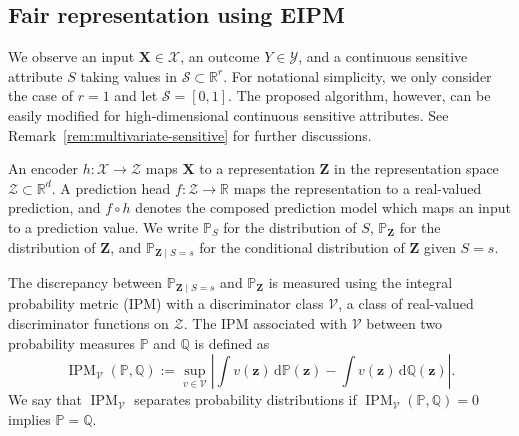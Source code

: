\documentclass{article} %
\begin{document}
\subsection{Fair representation using EIPM}
\label{sec:frem}

We observe an input $\mathbf{X}\in\mathcal{X}$, an outcome $Y\in\mathcal{Y}$, and a continuous sensitive attribute $S$ taking values in  $\mathcal{S}\subset \mathbb{R}^r.$ For notational simplicity,  we only consider the case of $r=1$ and let $\mathcal{S}=[0,1].$
The proposed algorithm, however, can be easily modified for high-dimensional continuous sensitive attributes. See Remark~\ref{rem:multivariate-sensitive} for further discussions.

An encoder $h:\mathcal{X}\to\mathcal{Z}$ maps $\mathbf{X}$ to a representation $\mathbf{Z}$ in the representation space $\mathcal{Z}\subset \mathbb{R}^d.$ A prediction head $f:\mathcal{Z}\to\mathbb{R}$ maps the representation to a real-valued prediction, and $f\circ h$ denotes the composed prediction model
which maps an input to a prediction value. 
We write $\mathbb{P}_S$ for the distribution of $S$, $\mathbb{P}_{\mathbf{Z}}$ for the distribution of $\mathbf{Z}$, and $\mathbb{P}_{\mathbf{Z}\mid S=s}$ for the conditional distribution of $\mathbf{Z}$ given $S=s$.  

The discrepancy between $\mathbb{P}_{\mathbf{Z}\mid S=s}$ and $\mathbb{P}_{\mathbf{Z}}$ is measured using the integral probability metric (IPM)
with a discriminator class $\mathcal{V}$, a class of real-valued discriminator functions on $\mathcal{Z}$. 
The IPM associated with $\mathcal{V}$ between two probability measures $\mathbb{P}$ and $\mathbb{Q}$ \citep{muller1997integral,sriperumbudur2012empirical} is defined as
\begin{equation}
  \operatorname{IPM}_{\mathcal{V}}(\mathbb{P},\mathbb{Q})
  :=\sup_{v\in\mathcal{V}}
  \left|\int v(\mathbf{z})\,\mathrm{d}\mathbb{P}(\mathbf{z})-\int v(\mathbf{z})\,\mathrm{d}\mathbb{Q}(\mathbf{z})\right|.
  \label{eq:prelim-ipm}
\end{equation}
We say that $\operatorname{IPM}_{\mathcal{V}}$ separates probability distributions if $\operatorname{IPM}_{\mathcal{V}}(\mathbb{P},\mathbb{Q})=0$ implies $\mathbb{P}=\mathbb{Q}$.  %
\end{document}

